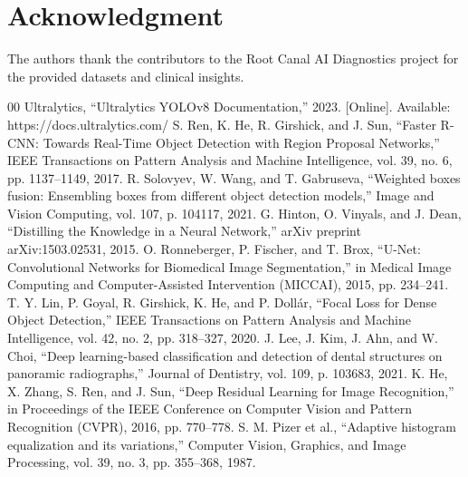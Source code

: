 \documentclass[conference]{IEEEtran}
\begin{document}
\section*{Acknowledgment}
The authors thank the contributors to the Root Canal AI Diagnostics project for the provided datasets and clinical insights.

\begin{thebibliography}{00}
 Ultralytics, ``Ultralytics YOLOv8 Documentation,'' 2023. [Online]. Available: https://docs.ultralytics.com/
 S. Ren, K. He, R. Girshick, and J. Sun, ``Faster R-CNN: Towards Real-Time Object Detection with Region Proposal Networks,'' IEEE Transactions on Pattern Analysis and Machine Intelligence, vol. 39, no. 6, pp. 1137--1149, 2017.
 R. Solovyev, W. Wang, and T. Gabruseva, ``Weighted boxes fusion: Ensembling boxes from different object detection models,'' Image and Vision Computing, vol. 107, p. 104117, 2021.
 G. Hinton, O. Vinyals, and J. Dean, ``Distilling the Knowledge in a Neural Network,'' arXiv preprint arXiv:1503.02531, 2015.
 O. Ronneberger, P. Fischer, and T. Brox, ``U-Net: Convolutional Networks for Biomedical Image Segmentation,'' in Medical Image Computing and Computer-Assisted Intervention (MICCAI), 2015, pp. 234--241.
 T. Y. Lin, P. Goyal, R. Girshick, K. He, and P. Dollár, ``Focal Loss for Dense Object Detection,'' IEEE Transactions on Pattern Analysis and Machine Intelligence, vol. 42, no. 2, pp. 318--327, 2020.
 J. Lee, J. Kim, J. Ahn, and W. Choi, ``Deep learning-based classification and detection of dental structures on panoramic radiographs,'' Journal of Dentistry, vol. 109, p. 103683, 2021.
 K. He, X. Zhang, S. Ren, and J. Sun, ``Deep Residual Learning for Image Recognition,'' in Proceedings of the IEEE Conference on Computer Vision and Pattern Recognition (CVPR), 2016, pp. 770--778.
 S. M. Pizer et al., ``Adaptive histogram equalization and its variations,'' Computer Vision, Graphics, and Image Processing, vol. 39, no. 3, pp. 355--368, 1987.
\end{thebibliography}
\end{document}
